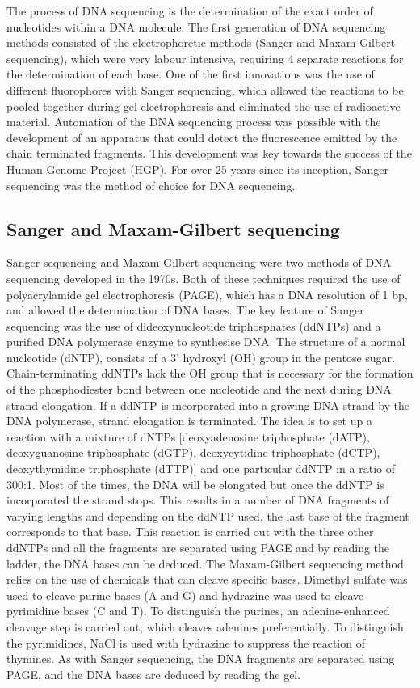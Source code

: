 The process of DNA sequencing is the determination of the exact order of nucleotides within a DNA molecule. The first generation of DNA sequencing methods consisted of the electrophoretic methods (Sanger and Maxam-Gilbert sequencing), which were very labour intensive, requiring 4 separate reactions for the determination of each base. One of the first innovations was the use of different fluorophores with Sanger sequencing, which allowed the reactions to be pooled together during gel electrophoresis and eliminated the use of radioactive material. Automation of the DNA sequencing process was possible with the development of an apparatus that could detect the fluorescence emitted by the chain terminated fragments. This development was key towards the success of the Human Genome Project (HGP). For over 25 years since its inception, Sanger sequencing was the method of choice for DNA sequencing.

\subsection{Sanger and Maxam-Gilbert sequencing}

Sanger sequencing\cite{pmid271968} and Maxam-Gilbert sequencing\cite{pmid265521} were two methods of DNA sequencing developed in the 1970s. Both of these techniques required the use of polyacrylamide gel electrophoresis (PAGE), which has a DNA resolution of 1 bp, and allowed the determination of DNA bases. The key feature of Sanger sequencing was the use of dideoxynucleotide triphosphates (ddNTPs) and a purified DNA polymerase enzyme to synthesise DNA. The structure of a normal nucleotide (dNTP), consists of a 3' hydroxyl (OH) group in the pentose sugar. Chain-terminating ddNTPs lack the OH group that is necessary for the formation of the phosphodiester bond between one nucleotide and the next during DNA strand elongation. If a ddNTP is incorporated into a growing DNA strand by the DNA polymerase, strand elongation is terminated. The idea is to set up a reaction with a mixture of dNTPs [deoxyadenosine triphosphate (dATP), deoxyguanosine triphosphate (dGTP), deoxycytidine triphosphate (dCTP), deoxythymidine triphosphate (dTTP)] and one particular ddNTP in a ratio of 300:1. Most of the times, the DNA will be elongated but once the ddNTP is incorporated the strand stops. This results in a number of DNA fragments of varying lengths and depending on the ddNTP used, the last base of the fragment corresponds to that base. This reaction is carried out with the three other ddNTPs and all the fragments are separated using PAGE and by reading the ladder, the DNA bases can be deduced. The Maxam-Gilbert sequencing method relies on the use of chemicals that can cleave specific bases. Dimethyl sulfate was used to cleave purine bases (A and G) and hydrazine was used to cleave pyrimidine bases (C and T). To distinguish the purines, an adenine-enhanced cleavage step is carried out, which cleaves adenines preferentially. To distinguish the pyrimidines, NaCl is used with hydrazine to suppress the reaction of thymines. As with Sanger sequencing, the DNA fragments are separated using PAGE, and the DNA bases are deduced by reading the gel.

